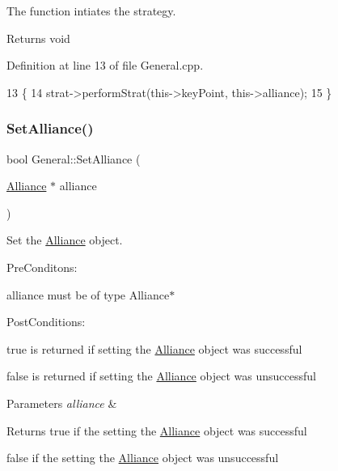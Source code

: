 The function intiates the strategy. 

\begin{DoxyReturn}{Returns}
void 
\end{DoxyReturn}


Definition at line 13 of file General.\+cpp.


\begin{DoxyCode}
13                                \{
14     strat->performStrat(this->keyPoint, this->alliance);
15 \}
\end{DoxyCode}
\mbox{\label{classGeneral_a4256fe7650e6162ca6785c2132364057}} 
\subsubsection{\texorpdfstring{Set\+Alliance()}{SetAlliance()}}
{\footnotesize\ttfamily bool General\+::\+Set\+Alliance (\begin{DoxyParamCaption}\item[{\hyperlink{classAlliance}{Alliance} $\ast$}]{alliance }\end{DoxyParamCaption})}



Set the \hyperlink{classAlliance}{Alliance} object. 

Pre\+Conditons\+:
\begin{DoxyItemize}
\item alliance must be of type Alliance$\ast$
\end{DoxyItemize}

Post\+Conditions\+:
\begin{DoxyItemize}
\item true is returned if setting the \hyperlink{classAlliance}{Alliance} object was successful
\item false is returned if setting the \hyperlink{classAlliance}{Alliance} object was unsuccessful
\end{DoxyItemize}


\begin{DoxyParams}{Parameters}
{\em alliance} & \\
\hline
\end{DoxyParams}
\begin{DoxyReturn}{Returns}
true if the setting the \hyperlink{classAlliance}{Alliance} object was successful 

false if the setting the \hyperlink{classAlliance}{Alliance} object was unsuccessful 
\end{DoxyReturn}


